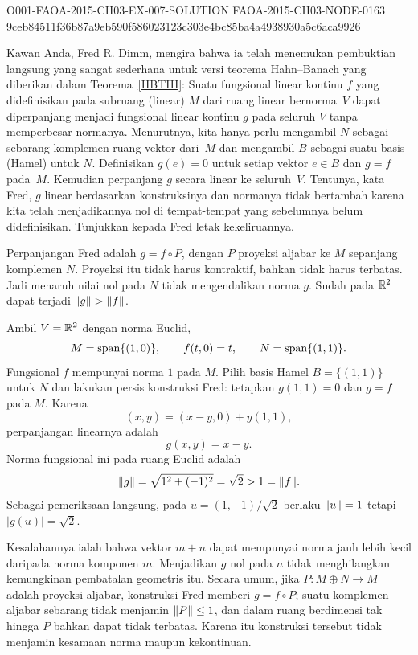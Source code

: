 \begin{o001solution}
  {O001-FAOA-2015-CH03-EX-007-SOLUTION}
  {FAOA-2015-CH03-NODE-0163}
  {9ceb84511f36b87a9eb590f586023123c303e4bc85ba4a4938930a5c6aca9926}
\begin{o001statement}
Kawan Anda, Fred R. Dimm, mengira bahwa ia telah menemukan pembuktian langsung yang sangat sederhana untuk
versi teorema Hahn--Banach yang diberikan dalam Teorema~\ref{HBTIII}: Suatu fungsional
linear kontinu $f$ yang didefinisikan pada subruang (linear) $M$ dari ruang linear bernorma~$V$ dapat
diperpanjang menjadi fungsional linear kontinu $g$ pada seluruh $V$ tanpa memperbesar
normanya. Menurutnya, kita hanya perlu mengambil $N$ sebagai sebarang komplemen ruang vektor
dari~$M$ dan mengambil $B$ sebagai suatu basis (Hamel) untuk $N$. Definisikan $g(e) = 0$ untuk setiap vektor $e
\in B$ dan $g = f$ pada~$M$. Kemudian perpanjang $g$ secara linear ke seluruh~$V$. Tentunya, kata Fred, $g$ linear berdasarkan konstruksinya dan normanya tidak bertambah karena kita
telah menjadikannya nol di tempat-tempat yang sebelumnya belum didefinisikan. Tunjukkan kepada Fred letak kekeliruannya.
\end{o001statement}
\begin{o001answer}
Perpanjangan Fred adalah $g=f\circ P$, dengan $P$ proyeksi aljabar ke $M$
sepanjang komplemen $N$. Proyeksi itu tidak harus kontraktif, bahkan tidak
harus terbatas. Jadi menaruh nilai nol pada $N$ tidak mengendalikan norma
$g$. Sudah pada $\mathbb{R}^2$ dapat terjadi $\lVert g\rVert>\lVert f\rVert$.
\end{o001answer}
\begin{o001proof}
Ambil $V=\mathbb{R}^2$ dengan norma Euclid,
\[
M=\operatorname{span}\{(1,0)\},\qquad
f(t,0)=t,\qquad
N=\operatorname{span}\{(1,1)\}.
\]
Fungsional $f$ mempunyai norma $1$ pada $M$. Pilih basis Hamel
$B=\{(1,1)\}$ untuk $N$ dan lakukan persis konstruksi Fred: tetapkan
$g(1,1)=0$ dan $g=f$ pada $M$. Karena
\[
(x,y)=(x-y,0)+y(1,1),
\]
perpanjangan linearnya adalah
\[
g(x,y)=x-y.
\]
Norma fungsional ini pada ruang Euclid adalah
\[
\lVert g\rVert=\sqrt{1^2+(-1)^2}=\sqrt2>1=\lVert f\rVert.
\]
Sebagai pemeriksaan langsung, pada
$u=(1,-1)/\sqrt2$ berlaku $\lVert u\rVert=1$ tetapi $|g(u)|=\sqrt2$.

Kesalahannya ialah bahwa vektor $m+n$ dapat mempunyai norma jauh lebih kecil
daripada norma komponen $m$. Menjadikan $g$ nol pada $n$ tidak menghilangkan
kemungkinan pembatalan geometris itu. Secara umum, jika
$P\colon M\oplus N\to M$ adalah proyeksi aljabar, konstruksi Fred memberi
$g=f\circ P$; suatu komplemen aljabar sebarang tidak menjamin
$\lVert P\rVert\le1$, dan dalam ruang berdimensi tak hingga $P$ bahkan dapat tidak
terbatas. Karena itu konstruksi tersebut tidak menjamin kesamaan norma maupun
kekontinuan.
\end{o001proof}
\end{o001solution}
